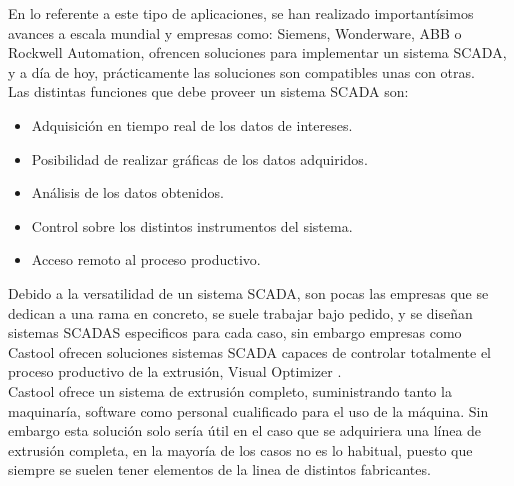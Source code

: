 En lo referente a este tipo de aplicaciones, se han realizado importantísimos avances a escala mundial y empresas como: Siemens, Wonderware, ABB o Rockwell Automation, ofrencen soluciones para implementar un sistema SCADA, y a día de hoy, prácticamente las soluciones son compatibles unas con otras.\\

Las distintas funciones que debe proveer un sistema SCADA son:

\begin{itemize}
    \item{Adquisición en tiempo real de los datos de intereses.}
    \item{Posibilidad de realizar gráficas de los datos adquiridos.}
    \item{Análisis de los datos obtenidos.}
    \item{Control sobre los distintos instrumentos del sistema.}
    \item{Acceso remoto al proceso productivo.}
\end{itemize}

Debido a la versatilidad de un sistema SCADA, son pocas las empresas que se dedican a una rama en concreto, se suele trabajar bajo pedido, y se diseñan sistemas SCADAS especificos para cada caso, sin embargo empresas como Castool ofrecen soluciones sistemas SCADA capaces de controlar totalmente el proceso productivo de la extrusión, Visual Optimizer \cite{castool}.\\

Castool ofrece un sistema de extrusión completo, suministrando tanto la maquinaría, software como personal cualificado para el uso de la máquina. Sin embargo esta solución solo sería útil en el caso que se adquiriera una línea de extrusión completa, en la mayoría de los casos no es lo habitual, puesto que siempre se suelen tener elementos de la linea de distintos fabricantes.\\






